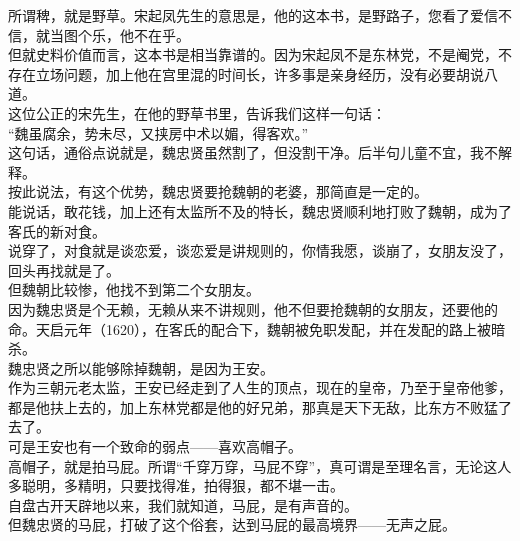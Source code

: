 \begin{multicols}{\theparacolNo}
所谓稗，就是野草。宋起凤先生的意思是，他的这本书，是野路子，您看了爱信不信，就当图个乐，他不在乎。\\

但就史料价值而言，这本书是相当靠谱的。因为宋起凤不是东林党，不是阉党，不存在立场问题，加上他在宫里混的时间长，许多事是亲身经历，没有必要胡说八道。\\

这位公正的宋先生，在他的野草书里，告诉我们这样一句话：\\

“魏虽腐余，势未尽，又挟房中术以媚，得客欢。”\\

这句话，通俗点说就是，魏忠贤虽然割了，但没割干净。后半句儿童不宜，我不解释。\\

按此说法，有这个优势，魏忠贤要抢魏朝的老婆，那简直是一定的。\\

能说话，敢花钱，加上还有太监所不及的特长，魏忠贤顺利地打败了魏朝，成为了客氏的新对食。\\

说穿了，对食就是谈恋爱，谈恋爱是讲规则的，你情我愿，谈崩了，女朋友没了，回头再找就是了。\\

但魏朝比较惨，他找不到第二个女朋友。\\

因为魏忠贤是个无赖，无赖从来不讲规则，他不但要抢魏朝的女朋友，还要他的命。天启元年（1620），在客氏的配合下，魏朝被免职发配，并在发配的路上被暗杀。\\

魏忠贤之所以能够除掉魏朝，是因为王安。\\

作为三朝元老太监，王安已经走到了人生的顶点，现在的皇帝，乃至于皇帝他爹，都是他扶上去的，加上东林党都是他的好兄弟，那真是天下无敌，比东方不败猛了去了。\\

可是王安也有一个致命的弱点——喜欢高帽子。\\

高帽子，就是拍马屁。所谓“千穿万穿，马屁不穿”，真可谓是至理名言，无论这人多聪明，多精明，只要找得准，拍得狠，都不堪一击。\\

自盘古开天辟地以来，我们就知道，马屁，是有声音的。\\

但魏忠贤的马屁，打破了这个俗套，达到马屁的最高境界——无声之屁。\\


\end{multicols}
